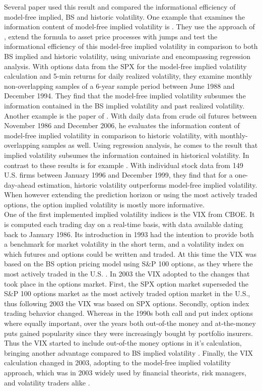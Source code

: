 Several paper used this result and compared the informational efficiency of model-free implied, \ac{BS} and historic volatility. One example that examines the information content of model-free implied volatility is \textcite{jiang2003}. They use the approach of \textcite{britten2000}, extend the formula to asset price processes with jumps and test the informational efficiency of this model-free implied volatility in comparison to both \ac{BS} implied and historic volatility, using univariate and encompassing regression analysis. With options data from the \ac{SPX} for the model-free implied volatility calculation and 5-min returns for daily realized volatility, they examine monthly non-overlapping samples of a 6-year sample period between June 1988 and December 1994. They find that the model-free implied volatility subsumes the information contained in the \ac{BS} implied volatility and past realized volatility. Another example is the paper of \textcite{bakanova2010}. With daily data from crude oil futures between November 1986 and December 2006, he evaluates the information content of model-free implied volatility in comparison to historic volatility, with monthly-overlapping samples as well. Using regression analysis, he comes to the result that implied volatility subsumes the information contained in historical volatility. In contrast to these results is for example \textcite{taylor2010}. With individual stock data from 149 U.S. firms between January 1996 and December 1999, they find that for a one-day-ahead estimation, historic volatility outperforms model-free implied volatility. When however extending the prediction horizon or using the most actively traded options, the option implied volatility is mostly more informative. \\
One of the first implemented implied volatility indices is the \ac{VIX} from \ac{CBOE}. It is computed each trading day on a real-time basis, with data available dating back to January 1986. Its introduction in 1993 had the intention to provide both a benchmark for market volatility in the short term, and a volatility index on which futures and options could be written and traded. At this time the \ac{VIX} was based on the \ac{BS} option pricing model using S\&P 100 options, as they where the most actively traded in the U.S. \parencite{whaley1995}. In 2003 the \ac{VIX} adopted to the changes that took place in the options market. First, the \ac{SPX} option market superseded the S\&P 100 options market as the most actively traded option market in the U.S., thus following 2003 the \ac{VIX} was based on \ac{SPX} options. Secondly, option index trading behavior changed. Whereas in the 1990s both call and put index options where equally important, over the years both out-of-the money and at-the-money puts gained popularity since they were increasingly bought by portfolio insurers. Thus the \ac{VIX} started to include out-of-the money options in it's calculation, bringing another advantage compared to \ac{BS} implied volatility \parencite{whaley2008}. Finally, the \ac{VIX} calculation changed in 2003, adopting to the model-free implied volatility approach, which was in 2003 widely used by financial theorists, risk managers, and volatility traders alike \parencite{exchange2009}.\\
